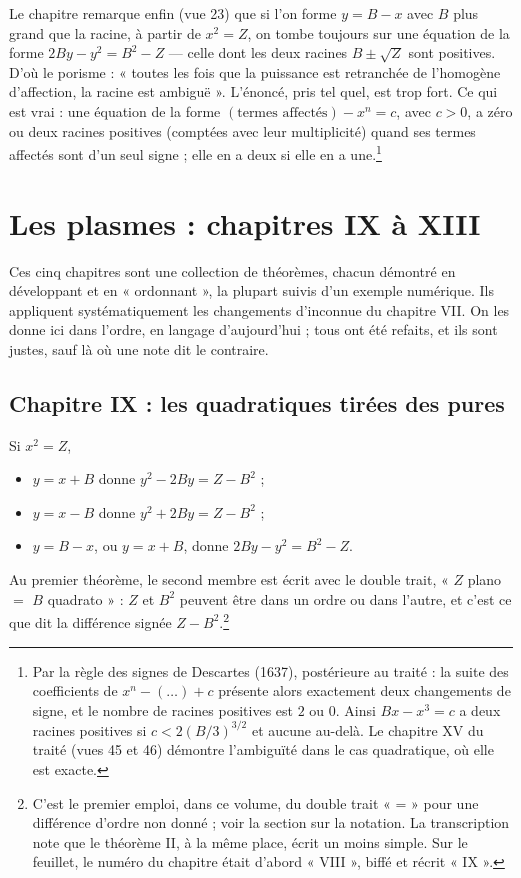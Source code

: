 \documentclass[11pt,a4paper]{article}
\begin{document}
Le chapitre remarque enfin (vue 23) que si l'on forme $y = B - x$ avec $B$ plus
grand que la racine, à partir de $x^2 = Z$, on tombe toujours sur une équation
de la forme $2By - y^2 = B^2 - Z$ — celle dont les deux racines $B \pm \sqrt{Z}$
sont positives. D'où le porisme : « toutes les fois que la puissance est
retranchée de l'homogène d'affection, la racine est ambiguë ». L'énoncé, pris
tel quel, est trop fort. Ce qui est vrai : une équation de la forme
$(\text{termes affectés}) - x^n = c$, avec $c > 0$, a zéro ou deux racines
positives (comptées avec leur multiplicité) quand ses termes affectés sont d'un
seul signe ; elle en a deux si elle en a une.\footnote{Par la règle des signes de
Descartes (1637), postérieure au traité : la suite des coefficients de
$x^n - (\ldots) + c$ présente alors exactement deux changements de signe, et le
nombre de racines positives est $2$ ou $0$. Ainsi $Bx - x^3 = c$ a deux racines
positives si $c < 2(B/3)^{3/2}$ et aucune au-delà. Le chapitre XV du traité
(vues 45 et 46) démontre l'ambiguïté dans le cas quadratique, où elle est
exacte.}

\section*{Les plasmes : chapitres IX à XIII}

Ces cinq chapitres sont une collection de théorèmes, chacun démontré en
développant et en « ordonnant », la plupart suivis d'un exemple numérique. Ils
appliquent systématiquement les changements d'inconnue du chapitre VII. On les
donne ici dans l'ordre, en langage d'aujourd'hui ; tous ont été refaits, et ils
sont justes, sauf là où une note dit le contraire.

\subsection*{Chapitre IX : les quadratiques tirées des pures}

Si $x^2 = Z$,
\begin{itemize}
  \item $y = x + B$ donne $y^2 - 2By = Z - B^2$ ;
  \item $y = x - B$ donne $y^2 + 2By = Z - B^2$ ;
  \item $y = B - x$, ou $y = x + B$, donne $2By - y^2 = B^2 - Z$.
\end{itemize}
Au premier théorème, le second membre est écrit avec le double trait,
« $Z$ plano $=$ $B$ quadrato » : $Z$ et $B^2$ peuvent être dans un ordre ou dans
l'autre, et c'est ce que dit la différence signée $Z - B^2$.\footnote{C'est le
premier emploi, dans ce volume, du double trait « = » pour une différence
d'ordre non donné ; voir la section sur la notation. La transcription note que
le théorème II, à la même place, écrit un moins simple. Sur le feuillet, le numéro
du chapitre était d'abord « VIII », biffé et récrit « IX ».}
\end{document}
